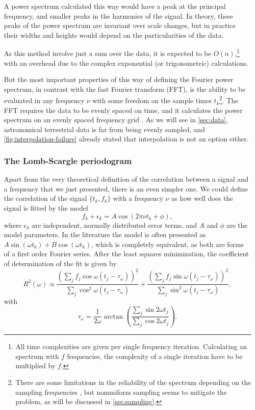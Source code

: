 	A power spectrum calculated this way would have a peak at the principal frequency, and smaller peaks in the harmonics of the signal.
	In theory, these peaks of the power spectrum are invariant over scale changes, 
	but in practice their widths and heights would depend on the particularities of the data.
	
	As this method involve just a sum over the data, it is expected to be $O(n)$,\footnote{
		All time complexities are given per single frequency iteration. 
		Calculating an spectrum with $f$ frequencies, the complexity of a single iteration have to be multiplied by $f$.
	} 
	with an overhead due to the complex exponential (or trigonometric) calculations.
	
	But the most important properties of this way of defining the Fourier power spectrum, in contrast with the fast Fourier transform (FFT),
	is the ability to be evaluated in any frequency $\nu$ with some freedom on the sample times $t_k$\footnote{
		There are some limitations in the reliability of the spectrum depending on the sampling frequencies \citep{Marvasti2001},
		but nonuniform sampling seems to mitigate the problem, as will be discussed in \autoref{sec:sampling}.
	}. 
	The FFT requires the data to be evenly spaced on time, and it calculates the power spectrum on an evenly spaced frequency grid \citep{Brigham1974}.
	As we will see in \autoref{sec:data}, astronomical terrestrial data is far from being evenly sampled, 
	and \autoref{fig:interpolation-failure} already stated that interpolation is not an option either.
	
	
	\subsubsection{The Lomb-Scargle periodogram}
	
	Apart from the very theoretical definition of the correlation between a signal and a frequency that we just presented,
	there is an even simpler one. We could define the correlation of the signal $\{t_k,f_k\}$ with a frequency $\nu$ as 
	how well does the signal is fitted by the model
	$$
	f_k + \epsilon_k = A \cos(2\pi \nu t_k +\phi),
	$$
	where $\epsilon_k$ are independent, normally distributed error terms, and $A$ and $\phi$ are the model parameters.
	In the literature the model is often presented as $A\sin(\omega t_k)+B\cos(\omega t_k)$, 
	which is completely equivalent, as both are forms of a first order Fourier series.
	After the least squares minimization, the coefficient of determination of the fit is given by \citep{Lomb1976,Scargle1982}
	\begin{equation}
		R^2(\omega) \propto \frac{\left(\sum_j f_j \cos\omega (t_j-\tau_\omega)\right)^2}{\sum_j \cos^2\omega(t_j-\tau_\omega)}+
		\frac{\left(\sum_j f_j \sin\omega (t_j-\tau_\omega)\right)^2}{\sum_j \sin^2\omega(t_j-\tau_\omega)}, \label{eq:lomb-scargle}
	\end{equation}
	with
	\begin{equation}
		\tau_\omega = \frac{1}{2\omega}\arctan\left(\frac{\sum_j \sin 2 \omega t_j}{\sum_j \cos 2 \omega t_j}\right).  \label{eq:tau}
	\end{equation}
	
